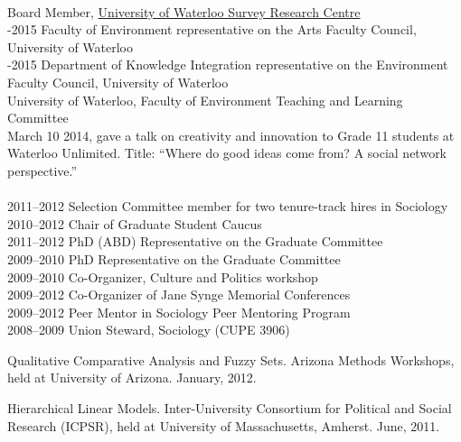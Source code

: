 \documentclass[9pt,usenames,dvipsnames]{article}
\begin{document}
 \\
 Board Member, \href{http://math.uwaterloo.ca/survey-research-centre/node/1}{University of Waterloo Survey Research Centre}  \\

-2015 Faculty of Environment representative on the Arts Faculty Council, University of Waterloo \\

-2015 Department of Knowledge Integration representative on the Environment Faculty Council, University of Waterloo \\

 University of Waterloo, Faculty of Environment Teaching and Learning Committee \\

\ind March 10 2014, gave a talk on creativity and innovation to Grade 11 students at Waterloo Unlimited. Title: ``Where do good ideas come from? A social network perspective.'' \\

\\
2011–2012 Selection Committee member for two tenure-track hires in Sociology\\
2010–2012 Chair of Graduate Student Caucus\\
2011–2012 PhD (ABD) Representative on the Graduate Committee\\
2009–2010 PhD Representative on the Graduate Committee\\
2009–2010 Co-Organizer, Culture and Politics workshop\\
2009–2012 Co-Organizer of Jane Synge Memorial Conferences\\
2009–2012 Peer Mentor in Sociology Peer Mentoring Program\\
2008–2009 Union Steward, Sociology (CUPE 3906)\\



\ind Qualitative Comparative Analysis and Fuzzy Sets. Arizona Methods Workshops, held at University of Arizona. January, 2012.

\ind Hierarchical Linear Models. Inter-University Consortium for Political and Social Research (ICPSR), held at University of Massachusetts, Amherst. June, 2011.\\

\end{document}
